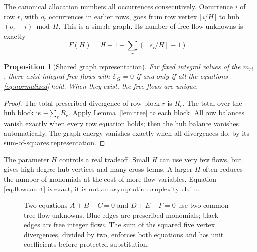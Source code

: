 \documentclass[11pt]{article}
\newtheorem{proposition}[theorem]{Proposition}
\theoremstyle{definition}\newtheorem{definition}[theorem]{Definition}
\theoremstyle{remark}\newtheorem{remark}[theorem]{Remark}
\newcommand{\ceil}[1]{\left\lceil #1\right\rceil}
\begin{document}
The canonical allocation numbers all occurrences consecutively. Occurrence
$i$ of row $r$, with $o_r$ occurrences in earlier rows, goes from row vertex
$\lfloor i/H\rfloor$ to hub $(o_r+i)\bmod H$. This is a simple graph. Its
number of free flow unknowns is exactly
\begin{equation}\label{eq:flowcount}
 F(H)=H-1+\sum_r\left(\ceil{s_r/H}-1\right).
\end{equation}

\begin{proposition}[Shared graph representation]\label{prop:graph-representation}
For fixed integral values of the $m_{ri}$, there exist integral free flows
with $\mathcal E_G=0$ if and only if all the equations
\eqref{eq:normalized} hold. When they exist, the free flows are unique.
\end{proposition}
\begin{proof}
The total prescribed divergence of row block $r$ is $R_r$. The total over the
hub block is $-\sum_rR_r$. Apply Lemma~\ref{lem:tree} to each block. All row
balances vanish exactly when every row equation holds; then the hub balance
vanishes automatically. The graph energy vanishes exactly when all divergences
do, by its sum-of-squares representation.
\end{proof}

The parameter $H$ controls a real tradeoff. Small $H$ can use very few flows,
but gives high-degree hub vertices and many cross terms. A larger $H$ often
reduces the number of monomials at the cost of more flow variables. Equation
\eqref{eq:flowcount} is exact; it is not an asymptotic complexity claim.

\begin{figure}[htbp]
\centering
{}
\caption{Two equations $A+B-C=0$ and $D+E-F=0$ use two common
tree-flow unknowns. Blue edges are prescribed monomials; black edges are free
integer flows. The sum of the squared five vertex divergences, divided by two,
enforces both equations and has unit coefficients before protected substitution.}
\label{fig:two-rows}
\end{figure}
\end{document}
